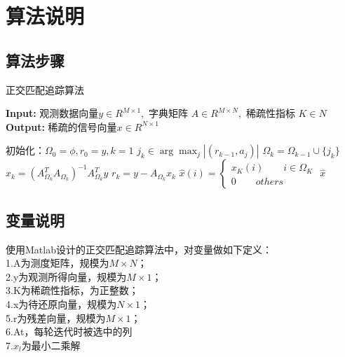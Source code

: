 \documentclass{article}
\begin{document}
\section{算法说明}
\subsection{算法步骤}
	\begin{algorithm}[H]
		\caption{正交匹配追踪算法} 
		\hspace*{0.02in} {\bf Input:} 
		观测数据向量$ y\in R^{M\times 1},$ 字典矩阵 $ A \in R^{M\times N},$ 稀疏性指标 $K\in N$\\
		\hspace*{0.02in} {\bf Output:} 
		稀疏的信号向量$ x \in R^{N\times 1}$ 
		\begin{algorithmic}[1]
			\State 初始化：$ \Omega_0=\phi,r_0=y,k=1 $ 
			\State $ j_k\in \arg{\max_j{|(r_{k-1},a_j)|}} $
			\State $ \Omega_k = \Omega_{k-1}\cup \{j_k\} $
			\State $ x_k = (A_{\Omega_k}^{T}A_{\Omega_k})^{-1}A_{\Omega_k}^{T}y $
			\State $ r_k = y-A_{\Omega_k}x_k $
			\EndWhile
			\State $  \hat{x}(i) = \left\{
			\begin{aligned}
				x_K(i) \qquad i\in \Omega_K\\
				0 \qquad others
			\end{aligned} 
			\right. $
			\State \Return $ \hat{x} $
		\end{algorithmic}
	\end{algorithm}
\subsection{变量说明}
使用Matlab设计的正交匹配追踪算法中，对变量做如下定义：\\
1.A为测度矩阵，规模为$ M\times N $；\\
2.y为观测所得向量，规模为$ M\times 1 $；\\
3.K为稀疏性指标，为正整数；\\
4.x为待还原向量，规模为$ N\times 1 $；\\
5.r为残差向量，规模为$ M\times 1 $；\\
6.At，每轮迭代时被选中的列\\
7.$ x_l $为最小二乘解
\end{document}
